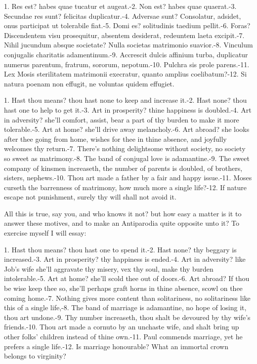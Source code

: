 {1. Res est? habes quae tucatur et augeat.-2. Non est? habes quae
quaerat.-3. Secundae res sunt? felicitas duplicatur.-4. Adversae sunt?
Consolatur, adsidet, onus participat ut tolerabile fiat.-5. Domi es?
solitudinis taedium pellit.-6. Foras? Discendentem visu prosequitur,
absentem desiderat, redeuntem laeta excipit.-7. Nihil jucundum absque
societate? Nulla societas matrimonio suavior.-8. Vinculum conjugalis
charitatis adamentinum.-9. Accrescit dulcis affinium turba, duplicatur
numerus parentum, fratrum, sororum, nepotum.-10. Pulchra sis prole
parens.-11. Lex Mosis sterilitatem matrimonii execratur, quanto amplius
coelibatum?-12. Si natura poenam non effugit, ne voluntas quidem
effugiet.

1. Hast thou means? thou hast none to keep and increase it.-2. Hast
none? thou hast one to help to get it.-3. Art in prosperity? thine
happiness is doubled.-4. Art in adversity? she'll comfort, assist, bear
a part of thy burden to make it more tolerable.-5. Art at home? she'll
drive away melancholy.-6. Art abroad? she looks after thee going from
home, wishes for thee in thine absence, and joyfully welcomes thy
return.-7. There's nothing delightsome without society, no society so
sweet as matrimony.-8. The band of conjugal love is adamantine.-9. The
sweet company of kinsmen increaseth, the number of parents is doubled,
of brothers, sisters, nephews.-10. Thou art made a father by a fair and
happy issue.-11. Moses curseth the barrenness of matrimony, how much
more a single life?-12. If nature escape not punishment, surely thy
will shall not avoid it.

All this is true, say you, and who knows it not? but how easy a matter
is it to answer these motives, and to make an Antiparodia quite
opposite unto it? To exercise myself I will essay:

1. Hast thou means? thou hast one to spend it.-2. Hast none? thy
beggary is increased.-3. Art in prosperity? thy happiness is ended.-4.
Art in adversity? like Job's wife she'll aggravate thy misery, vex thy
soul, make thy burden intolerable.-5. Art at home? she'll scold thee
out of doors.-6. Art abroad? If thou be wise keep thee so, she'll
perhaps graft horns in thine absence, scowl on thee coming home.-7.
Nothing gives more content than solitariness, no solitariness like this
of a single life,-8. The band of marriage is adamantine, no hope of
losing it, thou art undone.-9. Thy number increaseth, thou shalt be
devoured by thy wife's friends.-10. Thou art made a cornuto by an
unchaste wife, and shalt bring up other folks' children instead of
thine own.-11. Paul commends marriage, yet he prefers a single
life.-12. Is marriage honourable? What an immortal crown belongs to
virginity?

}
